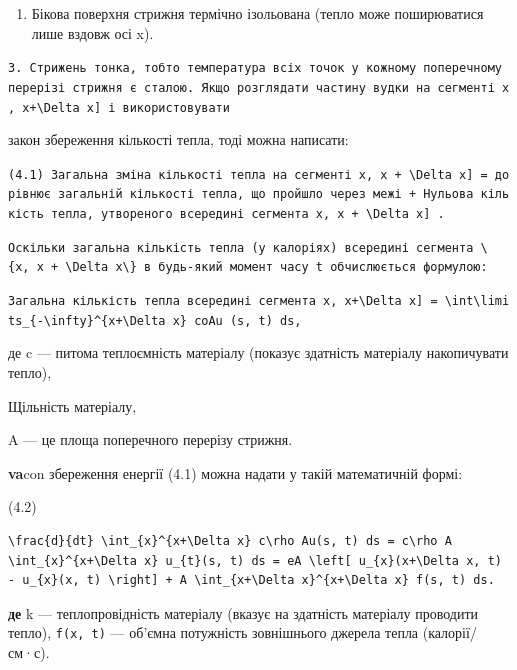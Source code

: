 \documentclass[
  ukrainian,
]{article}
\providecommand{\tightlist}{%
  \setlength{\itemsep}{0pt}\setlength{\parskip}{0pt}}
\begin{document}
\begin{enumerate}
\def\labelenumi{\arabic{enumi}.}
\setcounter{enumi}{1}
\tightlist
\item
  Бікова поверхня стрижня термічно ізольована (тепло може поширюватися
  лише вздовж осі x).
\end{enumerate}

\texttt{3.\ Стрижень\ тонка,\ тобто\ температура\ всіх\ точок\ у\ кожному\ поперечному\ перерізі\ стрижня\ є\ сталою.\ Якщо\ розглядати\ частину\ вудки\ на\ сегменті\ \textquotesingle{}{[}x,\ x+\textbackslash{}Delta\ x{]}\textquotesingle{}\ і\ використовувати}

закон збереження кількості тепла, тоді можна написати:

\texttt{(4.1)\ Загальна\ зміна\ кількості\ тепла\ на\ сегменті\ \textquotesingle{}{[}x,\ x\ +\ \textbackslash{}Delta\ x{]}\ =\textquotesingle{}\ дорівнює\ загальній\ кількості\ тепла,\ що\ пройшло\ через\ межі\ +\ Нульова\ кількість\ тепла,\ утвореного\ всередині\ сегмента\ \textquotesingle{}{[}x,\ x\ +\ \textbackslash{}Delta\ x{]}\textquotesingle{}\ .}

\texttt{Оскільки\ загальна\ кількість\ тепла\ (у\ калоріях)\ всередині\ сегмента\ \textquotesingle{}\textbackslash{}\{x,\ x\ +\ \textbackslash{}Delta\ x\textbackslash{}\}\textquotesingle{}\ в\ будь-який\ момент\ часу\ t\ обчислюється\ формулою:}

\texttt{Загальна\ кількість\ тепла\ всередині\ сегмента\ \textquotesingle{}{[}x,\ x+\textbackslash{}Delta\ x{]}\ =\ \textbackslash{}int\textbackslash{}limits\_\{-\textbackslash{}infty\}\^{}\{x+\textbackslash{}Delta\ x\}\ coAu\textquotesingle{}\ (s,\ t)\ ds,}

де c --- питома теплоємність матеріалу (показує здатність матеріалу
накопичувати тепло),

Щільність матеріалу,

A --- це площа поперечного перерізу стрижня.

\textbf{va}con збереження енергії (4.1) можна надати у такій
математичній формі:

(4.2)

\begin{verbatim}
\frac{d}{dt} \int_{x}^{x+\Delta x} c\rho Au(s, t) ds = c\rho A \int_{x}^{x+\Delta x} u_{t}(s, t) ds = eA \left[ u_{x}(x+\Delta x, t) - u_{x}(x, t) \right] + A \int_{x+\Delta x}^{x+\Delta x} f(s, t) ds.
\end{verbatim}

\textbf{де} k --- теплопровідність матеріалу (вказує на здатність
матеріалу проводити тепло), \texttt{f(x,\ t)} --- об'ємна потужність
зовнішнього джерела тепла (калорії/см·с).
\end{document}
